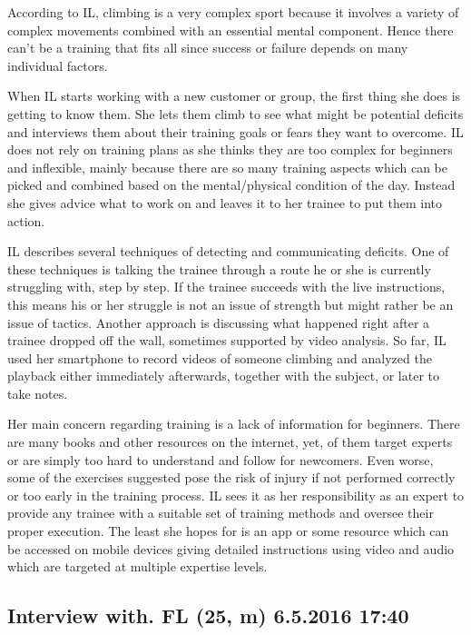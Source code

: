 According to IL, climbing is a very complex sport because it involves a variety of complex movements combined with an essential mental component. Hence there can't be a training that fits all since success or failure depends on many individual factors.

When IL starts working with a new customer or group, the first thing she does is getting to know them. She lets them climb to see what might be potential deficits and interviews them about their training goals or fears they want to overcome. IL does not rely on training plans as she thinks they are too complex for beginners and inflexible, mainly because there are so many training aspects which can be picked and combined based on the mental/physical condition of the day. Instead she gives advice what to work on and leaves it to her trainee to put them into action.

IL describes several techniques of detecting and communicating deficits. One of these techniques is talking the trainee through a route he or she is currently struggling with, step by step. If the trainee succeeds with the live instructions, this means his or her struggle is not an issue of strength but might rather be an issue of tactics. Another approach is discussing what happened right after a trainee dropped off the wall, sometimes supported by video analysis. So far, IL used her smartphone to record videos of someone climbing and analyzed the playback either immediately afterwards, together with the subject, or later to take notes.

Her main concern regarding training is a lack of information for beginners. There are many books and other resources on the internet, yet, of them target experts or are simply too hard to understand and follow for newcomers. Even worse, some of the exercises suggested pose the risk of injury if not performed correctly or too early in the training process. IL sees it as her responsibility as an expert to provide any trainee with a suitable set of training methods and oversee their proper execution. The least she hopes for is an app or some resource which can be accessed on mobile devices giving detailed instructions using video and audio which are targeted at multiple expertise levels.


\subsection{Interview with. FL (25, m) 6.5.2016 17:40}
\label{appendix:interview_f_l}

